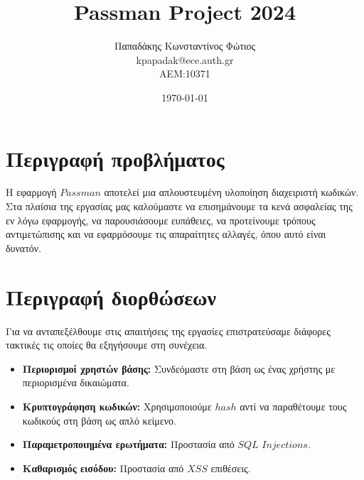\documentclass{report}
\begin{document}

\title{\Huge \bfseries {} Passman Project 2024} %
\author{Παπαδάκης Κωνσταντίνος Φώτιος\vspace{0.5cm} \\ kpapadak@ece.auth.gr\vspace{0.5cm}  \\ ΑΕΜ:10371} %
\date{\today}
\maketitle

\section*{Περιγραφή προβλήματος}
Η εφαρμογή $Passman$ αποτελεί μια απλουστευμένη υλοποίηση διαχειριστή κωδικών. Στα πλαίσια της εργασίας
μας καλούμαστε να επισημάνουμε τα κενά ασφαλείας της εν λόγω εφαρμογής, να παρουσιάσουμε ευπάθειες, να
προτείνουμε τρόπους αντιμετώπισης και να εφαρμόσουμε τις απαραίτητες αλλαγές, όπου αυτό είναι δυνατόν.

\section*{Περιγραφή διορθώσεων}
Για να ανταπεξέλθουμε στις απαιτήσεις της εργασίες επιστρατεύσαμε διάφορες τακτικές τις οποίες θα 
εξηγήσουμε στη συνέχεια.
\begin{itemize}
    \item \textbf{Περιορισμοί χρηστών βάσης:} Συνδεόμαστε στη βάση ως ένας χρήστης με περιορισμένα 
    δικαιώματα.
    \item \textbf{Κρυπτογράφηση κωδικών:} Χρησιμοποιούμε $hash$ αντί να παραθέτουμε τους κωδικούς 
    στη βάση ως απλό κείμενο.
    \item \textbf{Παραμετροποιημένα ερωτήματα:} Προστασία από $SQL$ $Injections$.
    \item \textbf{Καθαρισμός εισόδου:} Προστασία από $XSS$ επιθέσεις.
\end{itemize}
\end{document}
